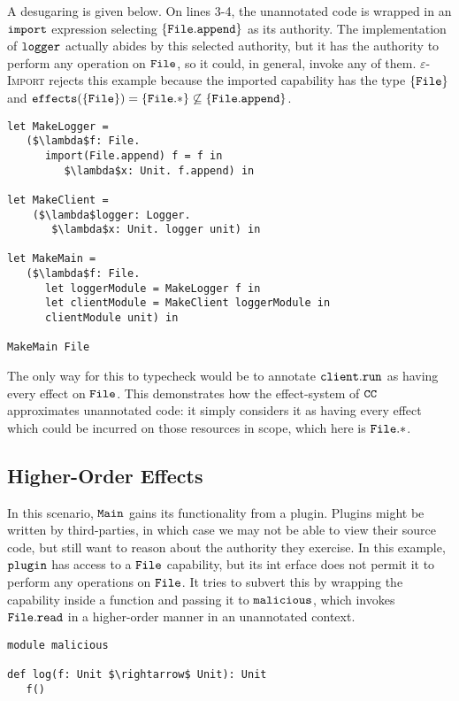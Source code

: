 A desugaring is given below. On lines 3-4, the unannotated code is wrapped in an $\mathtt{import}$ expression selecting $\{ \mathtt{File.append} \}$ as its authority. The implementation of $\mathtt{logger}$ actually abides by this selected authority, but it has the authority to perform any operation on $\mathtt{File}$, so it could, in general, invoke any of them. \textsc{$\varepsilon$-Import} rejects this example because the imported capability has the type $\{ \mathtt{File} \}$ and $\mathtt{effects}(\{ \mathtt{File} \}) = \{ \mathtt{File}.* \} \not\subseteq \{ \mathtt{ File.append } \}$.

\begin{lstlisting}
let MakeLogger =
   ($\lambda$f: File.
      import(File.append) f = f in
         $\lambda$x: Unit. f.append) in

let MakeClient =
	($\lambda$logger: Logger.
	   $\lambda$x: Unit. logger unit) in

let MakeMain =
   ($\lambda$f: File.
      let loggerModule = MakeLogger f in
      let clientModule = MakeClient loggerModule in
      clientModule unit) in

MakeMain File
\end{lstlisting}

The only way for this to typecheck would be to annotate $\mathtt{client.run}$ as having every effect on $\mathtt{File}$. This demonstrates how the effect-system of $\mathtt{CC}$ approximates unannotated code: it simply considers it as having every effect which could be incurred on those resources in scope, which here is $\mathtt{File}.*$.


\subsection{Higher-Order Effects}

In this scenario, $\mathtt{Main}$ gains its functionality from a plugin. Plugins might be written by third-parties, in which case we may not be able to view their source code, but still want to reason about the authority they exercise. In this example, $\mathtt{plugin}$ has access to a $\mathtt{File}$ capability, but its int erface does not permit it to perform any operations on $\mathtt{File}$. It tries to subvert this by wrapping the capability inside a function and passing it to $\mathtt{malicious}$, which invokes $\mathtt{File.read}$ in a higher-order manner in an unannotated context.

\begin{lstlisting}
module malicious

def log(f: Unit $\rightarrow$ Unit): Unit
   f()
\end{lstlisting}


